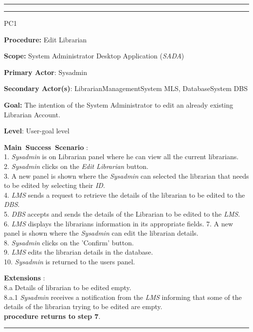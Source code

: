 \hrule


\vspace{0.5cm}
\hrule
\begin{lyxlist}{PC1}
\small{
\item [\textbf{Procedure:}] Edit Librarian
\item [\textbf{Scope:}] System Administrator Desktop Application (\emph{SADA})
\item [\textbf{Primary Actor}:] Sysadmin
\item [\textbf{Secondary Actor(s)}:] LibrarianManagementSystem MLS,
DatabaseSystem DBS
\item [\textbf{Goal:}] The intention of the System Administrator to
edit an already existing Librarian Account.
\item [\textbf{Level}:] User-goal level
\item [\textbf{Main~Success~Scenario}]:\\
1. \emph{Sysadmin} is on Librarian panel where he can view all the current
librarians.
\\
2. \emph{Sysadmin} clicks on the \emph{Edit Librarian} button. \\
3. A new panel is shown where the \emph{Sysadmin} can selected the librarian
that needs to be edited by selecting their \emph{ID}.
\\
4. \emph{LMS} sends a request to retrieve the details of the librarian to be
edited to the \emph{DBS}. 
\\
5. \emph{DBS} accepts and sends the details of the Librarian to be edited to the
\emph{LMS}. \\
6. \emph{LMS} displays the librarians information in its appropriate fields.
7. A new panel is shown where the \emph{Sysadmin} can edit the
librarian details. \\
8. \emph{Sysadmin} clicks on the 'Confirm' button. \\
9. \emph{LMS} edits the librarian details in the database. \\
10. \emph{Sysadmin} is returned to the users panel. \\



\item [\textbf{Extensions}]: \\
8.a Details of librarian to be edited empty.\\
\hspace*{0.5cm} 8.a.1 \emph{Sysadmin} receives a notification from
the \emph{LMS} informing that some of the details of the librarian trying to be
edited are empty. \\
\hspace*{0.5cm} \textbf{procedure returns to step 7}.\\
}
\end{lyxlist}
\hrule


